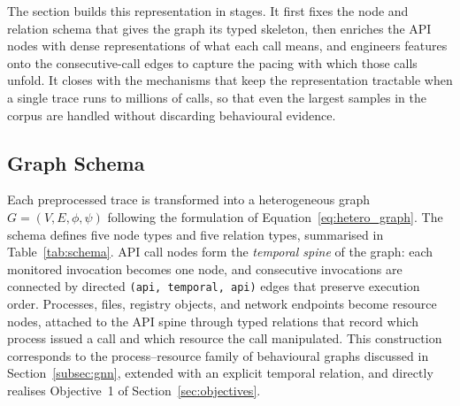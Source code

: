 \documentclass[%
    BCOR=10mm,
    DIV=13,
    toc=bibliography,
    toc=listof,
    oneside,
    12pt,
]{scrbook}
\begin{document}
The section builds this representation in stages. It first fixes the node and
relation schema that gives the graph its typed skeleton, then enriches the API
nodes with dense representations of what each call means, and engineers features
onto the consecutive-call edges to capture the pacing with which those calls
unfold. It closes with the mechanisms that keep the representation tractable when
a single trace runs to millions of calls, so that even the largest samples in
the corpus are handled without discarding behavioural evidence.

\subsection{Graph Schema}
\label{subsec:schema}

Each preprocessed trace is transformed into a heterogeneous graph
$G = (V, E, \phi, \psi)$ following the formulation of
Equation~\ref{eq:hetero_graph}. The schema defines five node types and five
relation types, summarised in Table~\ref{tab:schema}. API call nodes form the
\emph{temporal spine} of the graph: each monitored invocation becomes one node,
and consecutive invocations are connected by directed
\texttt{(api, temporal, api)} edges that preserve execution order. Processes,
files, registry objects, and network endpoints become resource nodes, attached
to the API spine through typed relations that record which process issued a
call and which resource the call manipulated. This construction corresponds to
the process--resource family of behavioural graphs discussed in
Section~\ref{subsec:gnn}, extended with an explicit temporal relation, and
directly realises Objective~1 of Section~\ref{sec:objectives}.
\end{document}
